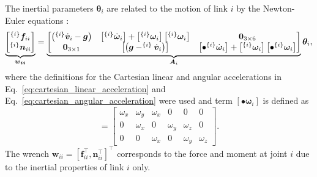 The inertial parameters $\bm{\theta}_i$ are related to the motion of link $i$
by the Newton-Euler equations \cite{Atkeson1986Estimationinertialparameters}:
\begin{equation}
	\underbrace{
		\begin{bmatrix}
			^{\left\lbrace i \right\rbrace}\bm{f}_{ii} \\ ^{\left\lbrace i \right\rbrace}\bm{n}_{ii}
	\end{bmatrix}}_{\bm{w_{ii}}}= 
	\underbrace{
		\begin{bmatrix}
			\left(^{\left\lbrace i \right\rbrace}\dot{\bm{v}}_i - \bm{g}\right) & \left[^{\left\lbrace i \right\rbrace}\dot{\bm{\omega}}_i\right] + \left[^{\left\lbrace i \right\rbrace}{\bm{\omega}}_i\right]\left[^{\left\lbrace i \right\rbrace}{\bm{\omega}}_i\right] & \bm{0}_{3 \times 6} \\
			\bm{0}_{3\times 1} & \left[\left(\bm{g}  - ^{\left\lbrace i \right\rbrace}\dot{\bm{v}}_i\right)\right] & \left[\bullet {}^{\left\lbrace i \right\rbrace}\dot{\bm{\omega}}_i\right] + \left[^{\left\lbrace i \right\rbrace}{\bm{\omega}}_i\right]\left[\bullet {}^{\left\lbrace i \right\rbrace}{\bm{\omega}}_i\right]
	\end{bmatrix}}_{\bm{A}_i} \bm{\theta}_i,
\end{equation}
where the definitions for the Cartesian linear and angular accelerations in Eq.~\eqref{eq:cartesian_linear_acceleration} and Eq.~\eqref{eq:cartesian_angular_acceleration} were used and term $\left[\bullet{\bm{\omega}}_i\right]$ is defined as
\begin{equation}
	[\bullet \bm{\omega}] = \begin{bmatrix}
		\omega_x & \omega_y & \omega_x & 0        & 0        & 0       \\
		0        & \omega_x & 0        & \omega_y & \omega_z & 0       \\
		0        & 0        & \omega_x & 0        & \omega_y & \omega_z
	\end{bmatrix}.
\end{equation}
The wrench $\bm{w}_{ii} =\left[\bm{f}_{ii}^\intercal, \bm{n}_{ii}^\intercal\right]^\intercal$ corresponds to the force and moment at joint $i$ due to the inertial properties of link $i$ only.

